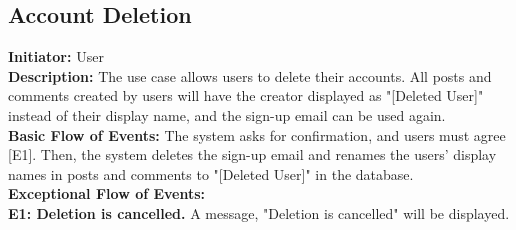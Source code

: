 \documentclass[a4paper,11pt]{scrreprt}
\begin{document}
\subsection{Account Deletion}
\textbf{\large Initiator: }User\\
\textbf{\large Description: }The use case allows users to delete their accounts. All posts and comments created by users will have the creator displayed as "[Deleted User]" instead of their display name, and the sign-up email can be used again.\\
\textbf{\large Basic Flow of Events: }The system asks for confirmation, and users must agree [E1]. Then, the system deletes the sign-up email and renames the users' display names in posts and comments to "[Deleted User]" in the database.\\
\textbf{\large Exceptional Flow of Events:}\\
\textbf{E1: Deletion is cancelled.} A message, "Deletion is cancelled" will be displayed.\\

\begin{figure}[H]
    \centering
    
\end{figure}
\end{document}
